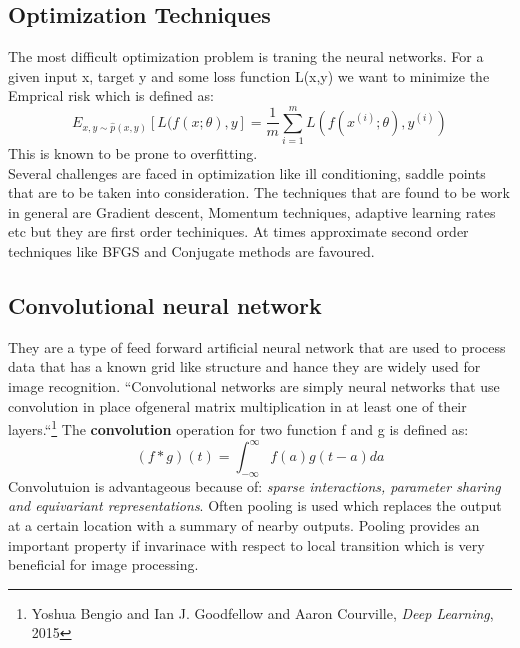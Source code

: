 \documentclass{article}
\begin{document}
\subsection{Optimization Techniques}
The most difficult optimization problem is traning the neural networks. For a given input x, target y and some loss function L(x,y) we want to minimize the Emprical risk which is defined as:
\begin{equation}
E_{x,y \sim \hat{p}(x,y)} [L(f(x;\theta),y] = \frac{1}{m} \sum_{i=1}^{m} L(f(x^{(i)};\theta), y^{(i)})
\end{equation}
This is known to be prone to overfitting.
\\Several challenges are faced in optimization like ill conditioning, saddle points that are to be taken into consideration. The techniques that are found to be work in general are Gradient descent, Momentum techniques, adaptive learning rates etc but they are first order techiniques. At times approximate second order techniques like BFGS and Conjugate methods are favoured.


\subsection{Convolutional neural network}
They are a type of feed forward artificial neural network that are used to process data that has a known grid like structure and hance they are widely used for image recognition. ``Convolutional networks are simply neural networks that use convolution in place ofgeneral matrix multiplication in at least one of their layers.``\footnote{Yoshua Bengio and Ian J. Goodfellow and Aaron Courville,\textit{ Deep Learning}, 2015} The \textbf{convolution} operation for two function f and g is defined as:
\begin{equation}
(f*g)(t)= \int_{-\infty}^{\infty} f(a) g(t-a) da
\end{equation} 
Convolutuion is advantageous because of: \textit{sparse interactions, parameter sharing and equivariant representations}. Often pooling is used which replaces the output at a certain location with a summary of nearby outputs. Pooling provides an important property if invarinace with respect to local transition which is very beneficial for image processing.
\end{document}
